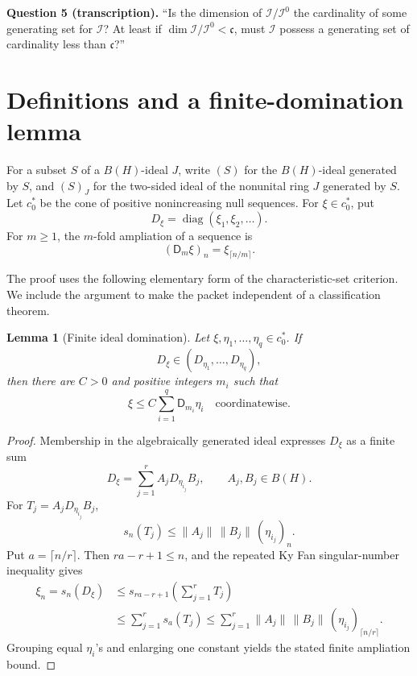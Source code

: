 \documentclass[11pt]{article}
\newtheorem{lemma}[theorem]{Lemma}
\newcommand{\BH}{B(H)}
\newcommand{\cc}{\mathfrak c}
\newcommand{\diag}{\operatorname{diag}}
\newcommand{\amp}{\mathsf D}
\begin{document}
\textbf{Question 5 (transcription).}
``Is the dimension of \(\mathcal I/\mathcal I^0\) the cardinality of some
generating set for \(\mathcal I\)?  At least if
\(\dim\mathcal I/\mathcal I^0<\cc\), must \(\mathcal I\) possess a
generating set of cardinality less than \(\cc\)?''

\section{Definitions and a finite-domination lemma}

For a subset \(S\) of a \(\BH\)-ideal \(J\), write \((S)\) for the
\(\BH\)-ideal generated by \(S\), and \((S)_J\) for the two-sided ideal of
the nonunital ring \(J\) generated by \(S\).  Let \(c_0^*\) be the cone of
positive nonincreasing null sequences.  For \(\xi\in c_0^*\), put
\[
 D_\xi=\diag(\xi_1,\xi_2,\ldots).
\]
For \(m\geq1\), the \(m\)-fold ampliation of a sequence is
\[
             (\amp_m\xi)_n=\xi_{\lceil n/m\rceil}.
\]

The proof uses the following elementary form of the characteristic-set
criterion.  We include the argument to make the packet independent of a
classification theorem.

\begin{lemma}[Finite ideal domination]\label{lem:finite-domination}
Let \(\xi,\eta_1,\ldots,\eta_q\in c_0^*\).  If
\[
             D_\xi\in(D_{\eta_1},\ldots,D_{\eta_q}),
\]
then there are \(C>0\) and positive integers \(m_i\) such that
\[
             \xi\leq C\sum_{i=1}^q\amp_{m_i}\eta_i
             \quad\text{coordinatewise}.
\]
\end{lemma}

\begin{proof}
Membership in the algebraically generated ideal expresses
\(D_\xi\) as a finite sum
\[
             D_\xi=\sum_{j=1}^r A_jD_{\eta_{i_j}}B_j,
             \qquad A_j,B_j\in\BH.
\]
For \(T_j=A_jD_{\eta_{i_j}}B_j\),
\[
 s_n(T_j)\leq\|A_j\|\,\|B_j\|\,(\eta_{i_j})_n.
\]
Put \(a=\lceil n/r\rceil\).  Then \(ra-r+1\leq n\), and the repeated
Ky Fan singular-number inequality \cite[Chapter 2]{Simon} gives
\[
\begin{aligned}
 \xi_n=s_n(D_\xi)
 &\leq s_{ra-r+1}\!\left(\sum_{j=1}^rT_j\right) \\
 &\leq\sum_{j=1}^rs_a(T_j)
 \leq\sum_{j=1}^r
       \|A_j\|\,\|B_j\|\,(\eta_{i_j})_{\lceil n/r\rceil}.
\end{aligned}
\]
Grouping equal \(\eta_i\)'s and enlarging one constant yields the stated
finite ampliation bound.
\end{proof}
\end{document}
